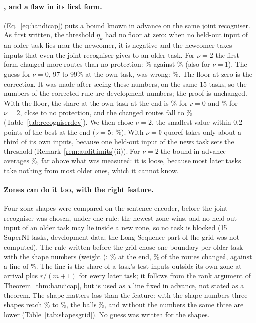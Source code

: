 \paragraph{\handicap{}, and a flaw in its first form.} \handicap{} (Eq.~\eqref{eq:handicap}) puts a bound known in advance on the same joint recogniser. As first written, the threshold $\eta_k$ had no floor at zero: when no held-out input of an older task lies near the newcomer, it is negative and the newcomer takes inputs that even the joint recogniser gives to an older task. For $\nu = 2$ the first form changed more routes than no protection: \AudDevHTTwoChanged{}\% against \AudDevHPrimeTNoneChanged{}\% (also for $\nu = 1$). The guess for $\nu = 0$, 97 to 99\% at the own task, was wrong: \AudDevHTZeroEnd{}\%.
The floor at zero is the correction. It was made after seeing these numbers, on the same 15 tasks, so the numbers of the corrected rule are development numbers; the proof is unchanged. With the floor, the share at the own task at the end is \AudDevHPrimeTZeroEnd{}\% for $\nu = 0$ and \AudDevHPrimeTTwoEnd{}\% for $\nu = 2$, close to no protection, and the changed routes fall to \AudDevHPrimeTTwoChanged{}\% (Table~\ref{tab:recogniserdev}).
We then chose $\nu = 2$, the smallest value within 0.2 points of the best at the end ($\nu = 5$: \AudDevHPrimeTFiveEnd{}\%). With $\nu = 0$ quoref takes only about a third of its own inputs, because one held-out input of the news task sets the threshold (Remark~\ref{rem:auditlimits}(ii)). For $\nu = 2$ the bound in advance averages \AudDevHPrimeTTwoBound{}\%, far above what was measured: it is loose, because most later tasks take nothing from most older ones, which it cannot know.

\paragraph{Zones can do it too, with the right feature.} Four zone shapes were compared on the sentence encoder, before the joint recogniser was chosen, under one rule: the newest zone wins, and no held-out input of an older task may lie inside a new zone, so no task is blocked (15 SuperNI tasks, development data; the Long Sequence part of the grid was not computed).
The rule written before the grid chose one boundary per older task with the shape numbers (weight \AudShapePairShapeWeight{}): \AudShapePairShapeEnd{}\% at the end, \AudShapePairShapeChanged{}\% of the routes changed, against a line of \AudShapePairShapeBound{}\%. The line is the share of a task's test inputs outside its own zone at arrival plus $r/(m+1)$ for every later task; it follows from the rank argument of Theorem~\ref{thm:handicap}, but is used as a line fixed in advance, not stated as a theorem.
The shape matters less than the feature: with the shape numbers three shapes reach \AudShapeOvrShapeEnd{}\% to \AudShapePairShapeEnd{}\%, the balls \AudShapePairKnnShapeEnd{}\%, and without the numbers the same three are lower (Table~\ref{tab:shapesgrid}). No guess was written for the shapes.

